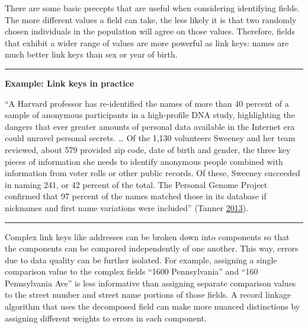 \documentclass[]{krantz}
\begin{document}
There are some basic precepts that are useful when considering
identifying fields. The more different values a field can take, the less
likely it is that two randomly chosen individuals in the population will
agree on those values. Therefore, fields that exhibit a wider range of
values are more powerful as link keys: names are much better link keys
than sex or year of birth.

\begin{center}\rule{0.5\linewidth}{\linethickness}\end{center}

\textbf{Example: Link keys in practice}

``A Harvard professor has re-identified the names of more than 40
percent of a sample of anonymous participants in a high-profile DNA
study, highlighting the dangers that ever greater amounts of personal
data available in the Internet era could unravel personal secrets.
\ldots{} Of the 1,130 volunteers Sweeney and her team reviewed, about
579 provided zip code, date of birth and gender, the three key pieces of
information she needs to identify anonymous people combined with
information from voter rolls or other public records. Of these, Sweeney
succeeded in naming 241, or 42 percent of the total. The Personal Genome
Project confirmed that 97 percent of the names matched those in its
database if nicknames and first name variations were included'' (Tanner
\protect\hyperlink{ref-forbesharvard}{2013}).

\begin{center}\rule{0.5\linewidth}{\linethickness}\end{center}

Complex link keys like addresses can be broken down into components so
that the components can be compared independently of one another. This
way, errors due to data quality can be further isolated. For example,
assigning a single comparison value to the complex fields ``1600
Pennsylvania'' and ``160 Pennsylvania Ave'' is less informative than
assigning separate comparison values to the street number and street
name portions of those fields. A record linkage algorithm that uses the
decomposed field can make more nuanced distinctions by assigning
different weights to errors in each component.
\end{document}
